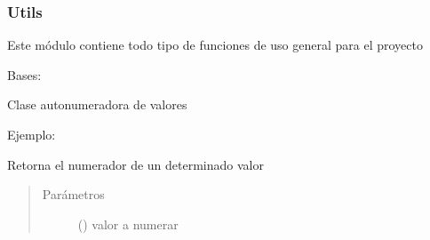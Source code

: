 \documentclass[a4paper,12pt,spanish]{sphinxmanual}
\begin{document}
\label{\detokenize{openerm.Utils:utils}}\label{\detokenize{openerm.Utils:module-openerm.Utils}}\label{\detokenize{openerm.Utils:utils}}

\subsubsection{Utils}
\label{\detokenize{openerm.Utils:id1}}\label{\detokenize{openerm.Utils::doc}}
Este módulo contiene todo tipo de funciones de uso general para el
proyecto 

\begin{fulllineitems}
\label{\detokenize{openerm.Utils:openerm.Utils.AutoNum}}
Bases: 

Clase autonumeradora de valores
\begin{description}
\item[{Ejemplo:}] \leavevmode
\begin{sphinxVerbatim}[commandchars=\\\{\}]
   
  
\end{sphinxVerbatim}

\end{description}

\begin{fulllineitems}
\label{\detokenize{openerm.Utils:openerm.Utils.AutoNum.get}}
Retorna el numerador de un determinado valor
\begin{quote}\begin{description}
\item[{Parámetros}] \leavevmode
{} () \textendash{} valor a numerar


\end{description}
\end{quote}
\end{fulllineitems}
\end{fulllineitems}
\end{document}

